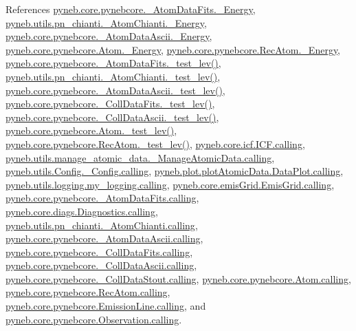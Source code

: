 References \hyperlink{pynebcore_8py_source_l00101}{pyneb.\-core.\-pynebcore.\-\_\-\-Atom\-Data\-Fits.\-\_\-\-Energy}, \hyperlink{pn__chianti_8py_source_l00285}{pyneb.\-utils.\-pn\-\_\-chianti.\-\_\-\-Atom\-Chianti.\-\_\-\-Energy}, \hyperlink{pynebcore_8py_source_l00413}{pyneb.\-core.\-pynebcore.\-\_\-\-Atom\-Data\-Ascii.\-\_\-\-Energy}, \hyperlink{pynebcore_8py_source_l01320}{pyneb.\-core.\-pynebcore.\-Atom.\-\_\-\-Energy}, \hyperlink{pynebcore_8py_source_l02662}{pyneb.\-core.\-pynebcore.\-Rec\-Atom.\-\_\-\-Energy}, \hyperlink{pynebcore_8py_source_l00178}{pyneb.\-core.\-pynebcore.\-\_\-\-Atom\-Data\-Fits.\-\_\-test\-\_\-lev()}, \hyperlink{pn__chianti_8py_source_l00304}{pyneb.\-utils.\-pn\-\_\-chianti.\-\_\-\-Atom\-Chianti.\-\_\-test\-\_\-lev()}, \hyperlink{pynebcore_8py_source_l00447}{pyneb.\-core.\-pynebcore.\-\_\-\-Atom\-Data\-Ascii.\-\_\-test\-\_\-lev()}, \hyperlink{pynebcore_8py_source_l00677}{pyneb.\-core.\-pynebcore.\-\_\-\-Coll\-Data\-Fits.\-\_\-test\-\_\-lev()}, \hyperlink{pynebcore_8py_source_l01045}{pyneb.\-core.\-pynebcore.\-\_\-\-Coll\-Data\-Ascii.\-\_\-test\-\_\-lev()}, \hyperlink{pynebcore_8py_source_l01525}{pyneb.\-core.\-pynebcore.\-Atom.\-\_\-test\-\_\-lev()}, \hyperlink{pynebcore_8py_source_l02672}{pyneb.\-core.\-pynebcore.\-Rec\-Atom.\-\_\-test\-\_\-lev()}, \hyperlink{icf_8py_source_l00016}{pyneb.\-core.\-icf.\-I\-C\-F.\-calling}, \hyperlink{manage__atomic__data_8py_source_l00018}{pyneb.\-utils.\-manage\-\_\-atomic\-\_\-data.\-\_\-\-Manage\-Atomic\-Data.\-calling}, \hyperlink{_config_8py_source_l00032}{pyneb.\-utils.\-Config.\-\_\-\-Config.\-calling}, \hyperlink{plot_atomic_data_8py_source_l00042}{pyneb.\-plot.\-plot\-Atomic\-Data.\-Data\-Plot.\-calling}, \hyperlink{logging_8py_source_l00044}{pyneb.\-utils.\-logging.\-my\-\_\-logging.\-calling}, \hyperlink{emis_grid_8py_source_l00044}{pyneb.\-core.\-emis\-Grid.\-Emis\-Grid.\-calling}, \hyperlink{pynebcore_8py_source_l00097}{pyneb.\-core.\-pynebcore.\-\_\-\-Atom\-Data\-Fits.\-calling}, \hyperlink{diags_8py_source_l00169}{pyneb.\-core.\-diags.\-Diagnostics.\-calling}, \hyperlink{pn__chianti_8py_source_l00240}{pyneb.\-utils.\-pn\-\_\-chianti.\-\_\-\-Atom\-Chianti.\-calling}, \hyperlink{pynebcore_8py_source_l00318}{pyneb.\-core.\-pynebcore.\-\_\-\-Atom\-Data\-Ascii.\-calling}, \hyperlink{pynebcore_8py_source_l00585}{pyneb.\-core.\-pynebcore.\-\_\-\-Coll\-Data\-Fits.\-calling}, \hyperlink{pynebcore_8py_source_l00936}{pyneb.\-core.\-pynebcore.\-\_\-\-Coll\-Data\-Ascii.\-calling}, \hyperlink{pynebcore_8py_source_l01156}{pyneb.\-core.\-pynebcore.\-\_\-\-Coll\-Data\-Stout.\-calling}, \hyperlink{pynebcore_8py_source_l01229}{pyneb.\-core.\-pynebcore.\-Atom.\-calling}, \hyperlink{pynebcore_8py_source_l02643}{pyneb.\-core.\-pynebcore.\-Rec\-Atom.\-calling}, \hyperlink{pynebcore_8py_source_l03385}{pyneb.\-core.\-pynebcore.\-Emission\-Line.\-calling}, and \hyperlink{pynebcore_8py_source_l03541}{pyneb.\-core.\-pynebcore.\-Observation.\-calling}.


